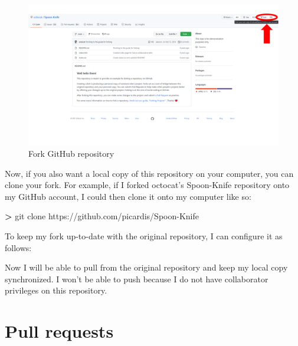 \documentclass[
]{book}
\newenvironment{Shaded}{\begin{snugshade}}{\end{snugshade}}
\newcommand{\FunctionTok}[1]{\textcolor[rgb]{0.00,0.00,0.00}{#1}}
\newcommand{\NormalTok}[1]{#1}
\newcommand{\OperatorTok}[1]{\textcolor[rgb]{0.81,0.36,0.00}{\textbf{#1}}}
\begin{document}
\begin{figure}

{\centering \includegraphics[width=1\linewidth]{img/github-03} 

}

\caption{Fork GitHub repository}\label{fig:github03}
\end{figure}

Now, if you also want a local copy of this repository on your computer, you can clone your fork. For example, if I forked octocat's Spoon-Knife repository onto my GitHub account, I could then clone it onto my computer like so:

\begin{Shaded}
\begin{Highlighting}[]
\OperatorTok{>} \FunctionTok{git}\NormalTok{ clone https://github.com/picardis/Spoon-Knife}
\end{Highlighting}
\end{Shaded}

To keep my fork up-to-date with the original repository, I can configure it as follows:

\begin{Shaded}
\end{Shaded}

Now I will be able to pull from the original repository and keep my local copy synchronized. I won't be able to push because I do not have collaborator privileges on this repository.

\hypertarget{pull-requests}{%
\section{Pull requests}\label{pull-requests}}
\end{document}
